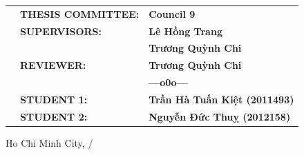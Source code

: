 \documentclass[12pt, a4paper]{report}
\begin{document}
\begin{titlepage}
    \vspace{1cm}
    \begin{table}[H]
        \resizebox{\textwidth}{!} {
            \begin{tabular}{rll}
                \hspace{4 cm}
                 & \textbf{\Large THESIS COMMITTEE:} & \textbf{\Large Council 9}                   \\
                 & \textbf{\Large SUPERVISORS:}      & \textbf{\Large Lê Hồng Trang}               \\
                 & \textbf{\Large }                  & \textbf{\Large Trương Quỳnh Chi}            \\
                 & \textbf{\Large REVIEWER:}         & \textbf{\Large Trương Quỳnh Chi}            \\
                 &                                   & \textbf{---o0o---}                          \\
                 & \textbf{\Large STUDENT 1:}        & \textbf{\Large Trần Hà Tuấn Kiệt (2011493)} \\
                 & \textbf{\Large STUDENT 2:}        & \textbf{\Large Nguyễn Đức Thuỵ (2012158)}
            \end{tabular}
        }
    \end{table}
    \vspace{1cm}

    \begin{center}
        {\large Ho Chi Minh City, \the\month/\the\year}
    \end{center}
\end{titlepage}


\newpage

\end{document}
